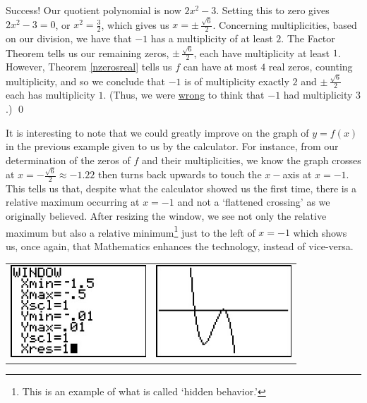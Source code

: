 \begin{ex}
\begin{enumerate}
Success!  Our quotient polynomial is now $2x^2 - 3$.  Setting this to zero gives $2x^2 - 3 = 0$, or $x^2 = \frac{3}{2}$, which gives us $x = \pm \, \frac{\sqrt{6}}{2}$.  Concerning multiplicities, based on our division, we have that $-1$ has a multiplicity of at least $2$. The Factor Theorem tells us our remaining zeros, $\pm \, \frac{\sqrt{6}}{2}$, each have multiplicity at least $1$.  However, Theorem \ref{nzerosreal} tells us $f$ can have at most $4$ real zeros, counting multiplicity, and so we conclude that $-1$ is of multiplicity exactly $2$ and $\pm \, \frac{\sqrt{6}}{2}$ each has multiplicity $1$.  (Thus, we were \underline{wrong} to think that $-1$ had multiplicity $3$.) \qed

\end{enumerate}


\end{ex}

It is interesting to note that we could greatly improve on the graph of $y=f(x)$ in the previous example given to us by the calculator. For instance, from our determination of the zeros of $f$ and their multiplicities, we know the graph crosses at $x=-\frac{\sqrt{6}}{2} \approx -1.22$ then turns back upwards to touch the $x-$axis at $x=-1$. This tells us that, despite what the calculator showed us the first time, there is a relative maximum occurring at $x = -1$ and not a `flattened crossing' as we originally believed.  After resizing the window, we see not only the relative maximum but also a relative minimum\footnote{This is an example of what is called `hidden behavior.'} just to the left of $x = -1$ which shows us, once again, that Mathematics enhances the technology, instead of vice-versa.

\begin{center}

\begin{tabular}{cc}

\includegraphics[width=2in]{./PolynomialsGraphics/RealZero03.jpg} \hspace{0.75in} & \includegraphics[width=2in]{./PolynomialsGraphics/RealZero04.jpg}

\end{tabular}
\end{center} 

